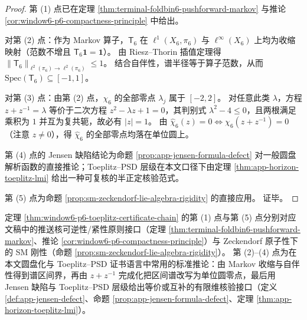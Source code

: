 \begin{proof}
第 (1) 点已在定理 \ref{thm:terminal-foldbin6-pushforward-markov} 与推论 \ref{cor:window6-p6-compactness-principle} 中给出。
\par
对第 (2) 点：作为 Markov 算子，\(\mathsf{T}_6\) 在 \(\ell^1(X_6,\pi_6)\) 与 \(\ell^\infty(X_6)\) 上均为收缩映射（范数不增且 \(\mathsf{T}_6\mathbf 1=\mathbf 1\)）。
由 Riesz--Thorin 插值定理得 \(\|\mathsf{T}_6\|_{\ell^2(\pi_6)\to \ell^2(\pi_6)}\le 1\)。
结合自伴性，谱半径等于算子范数，从而 \(\mathrm{Spec}(\mathsf{T}_6)\subseteq[-1,1]\)。
\par
对第 (3) 点：由第 (2) 点，\(\chi_6\) 的全部零点 \(\lambda_j\) 属于 \([-2,2]\)。
对任意此类 \(\lambda\)，方程 \(z+z^{-1}=\lambda\) 等价于二次方程 \(z^2-\lambda z+1=0\)，其判别式 \(\lambda^2-4\le 0\)，且两根满足乘积为 \(1\) 并互为复共轭，故必有 \(|z|=1\)。
由 \(\widehat{\chi}_6(z)=0\iff \chi_6(z+z^{-1})=0\)（注意 \(z\neq 0\)），得 \(\widehat{\chi}_6\) 的全部零点均落在单位圆上。
\par
第 (4) 点的 Jensen 缺陷结论为命题 \ref{prop:app-jensen-formula-defect} 对一般圆盘解析函数的直接推论；Toeplitz--PSD 层级在本文口径下由定理 \ref{thm:app-horizon-toeplitz-lmi} 给出一种可复核的半正定核验范式。
\par
第 (5) 点为命题 \ref{prop:sm-zeckendorf-lie-algebra-rigidity} 的直接应用。
证毕。
\end{proof}

\begin{remark}[链条中已作为正文结论出现的环节与标准推论环节]\label{rem:window6-p6-toeplitz-chain-what-is-internal}
定理 \ref{thm:window6-p6-toeplitz-certificate-chain} 的第 (1) 点与第 (5) 点分别对应文稿中的推送核可逆性/紧性原则接口（定理 \ref{thm:terminal-foldbin6-pushforward-markov}、推论 \ref{cor:window6-p6-compactness-principle}）与 Zeckendorf 原子性下的 SM 刚性（命题 \ref{prop:sm-zeckendorf-lie-algebra-rigidity}）。
第 (2)--(4) 点为在本文圆盘化与 Toeplitz--PSD 证书语言中常用的标准推论：由 Markov 收缩与自伴性得到谱区间界，再由 \(z+z^{-1}\) 完成化把区间谱改写为单位圆零点，最后用 Jensen 缺陷与 Toeplitz--PSD 层级给出等价或互补的有限维核验接口（定义 \ref{def:app-jensen-defect}、命题 \ref{prop:app-jensen-formula-defect}、定理 \ref{thm:app-horizon-toeplitz-lmi}）。
\end{remark}






